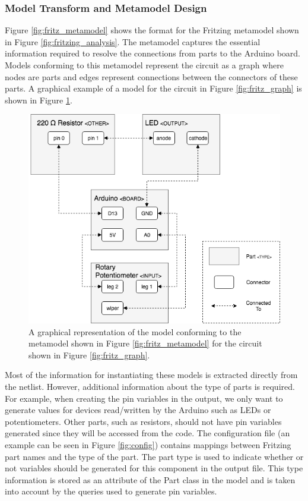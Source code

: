 \documentclass{UoYCSproject}
\begin{document}
\subsubsection{Model Transform and Metamodel Design}
Figure \ref{fig:fritz_metamodel} shows the format for the Fritzing metamodel shown in Figure \ref{fig:fritzing_analysis}. The metamodel captures the essential information required to resolve the connections from parts to the Arduino board. Models conforming to this metamodel represent the circuit as a graph where nodes are parts and edges represent connections between the connectors of these parts. A graphical example of a model for the circuit in Figure \ref{fig:fritz_graph} is shown in Figure \ref{fig:fritz_model}.

\begin{figure}[h!]
  \centering
  \includegraphics[width=0.6\linewidth]{graphics/fritz_model.png}
  \caption{A graphical representation of the model conforming to the metamodel shown in Figure \ref{fig:fritz_metamodel} for the circuit shown in Figure \ref{fig:fritz_graph}.}
  \label{fig:fritz_model}
\end{figure}

Most of the information for instantiating these models is extracted directly from the netlist. However, additional information about the type of parts is required. For example, when creating the pin variables in the output, we only want to generate values for devices read/written by the Arduino such as LEDs or potentiometers. Other parts, such as resistors, should not have pin variables generated since they will be accessed from the code. The configuration file (an example can be seen in Figure \ref{fig:config}) contains mappings between Fritzing part names and the type of the part. The part type is used to indicate whether or not variables should be generated for this component in the output file. This type information is stored as an attribute of the Part class in the model and is taken into account by the queries used to generate pin variables.
\end{document}
